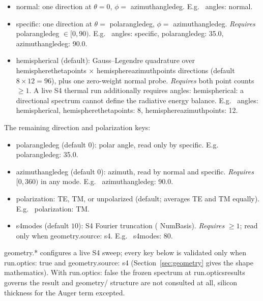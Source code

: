 \documentclass[11pt,a4paper,twoside]{article}
\DeclareRobustCommand{\code}[1]{\begingroup\upshape\ttfamily
  \def\_{\allowbreak\textunderscore\allowbreak}#1\endgroup}
\begin{document}
\begin{itemize}
  \item \code{normal}: one direction at \(\theta=0\), \(\phi=\)
        \code{azimuth\_angle\_deg}. E.g.\ \code{angles: normal}.
  \item \code{specific}: one direction at \(\theta=\)
        \code{polar\_angle\_deg}, \(\phi=\)
        \code{azimuth\_angle\_deg}. \textit{Requires}
        \code{polar\_angle\_deg} \(\in[0,90)\). E.g.\
        \code{angles: specific, polar\_angle\_deg: 35.0,
        azimuth\_angle\_deg: 90.0}.
  \item \code{hemispherical} (default): Gauss--Legendre quadrature over
        \code{hemisphere\_theta\_points} \(\times\)
        \code{hemisphere\_azimuth\_points} directions (default
        \(8\times12=96\)), plus one zero-weight normal probe.
        \textit{Requires} both point counts \(\geq 1\). A live S4 thermal run
        additionally requires \code{angles: hemispherical}: a directional
        spectrum cannot define the radiative energy balance. E.g.\
        \code{angles: hemispherical, hemisphere\_theta\_points: 8,
        hemisphere\_azimuth\_points: 12}.
\end{itemize}

The remaining direction and polarization keys:

\begin{itemize}
  \item \code{polar\_angle\_deg} (default \(0\)): polar angle, read only by
        \code{specific}. E.g.\ \code{polar\_angle\_deg: 35.0}.
  \item \code{azimuth\_angle\_deg} (default \(0\)): azimuth, read by
        \code{normal} and \code{specific}. \textit{Requires} \([0,360)\) in
        any mode. E.g.\ \code{azimuth\_angle\_deg: 90.0}.
  \item \code{polarization}: \code{TE}, \code{TM}, or \code{unpolarized}
        (default; averages TE and TM equally). E.g.\ \code{polarization: TM}.
  \item \code{s4\_modes} (default \(10\)): S4 Fourier truncation
        (\code{NumBasis}). \textit{Requires} \(\geq 1\); read only when
        \code{geometry.source: s4}. E.g.\ \code{s4\_modes: 80}.
\end{itemize}

\code{geometry.*} configures a live S4 sweep; every key below is validated
only when \code{run.optics: true} and \code{geometry.source: s4}
(Section~\ref{sec:geometry} gives the shape mathematics). With
\code{run.optics: false} the frozen spectrum at \code{run.optics\_results}
governs the result and \code{geometry}/\code{structure} are not consulted at
all, silicon thickness for the Auger term excepted.
\end{document}
